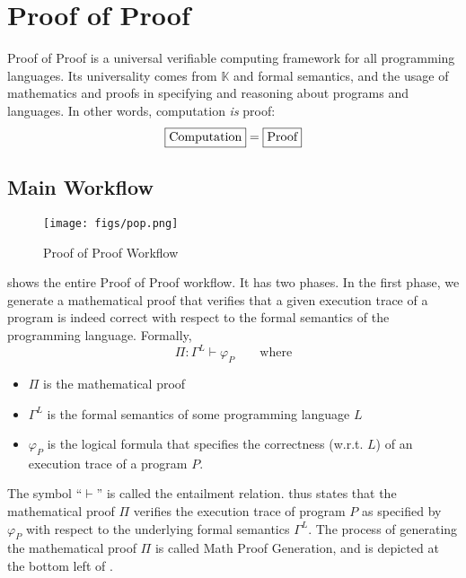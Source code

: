 \documentclass{article}
\newcommand{\K}{\ensuremath{\mathbb{K}}\xspace}
\begin{document}
\section{Proof of Proof}
\label{sec:pop}

Proof of Proof is a universal verifiable computing framework for all programming languages.
Its universality comes from \K and formal semantics,
and the usage of mathematics and proofs
in specifying and reasoning about programs and languages.
In other words,
computation \emph{is} proof:
\begin{equation*}
\boxed{\text{Computation}} = \boxed{\text{Proof\vphantom{Cp}}}
\end{equation*}


\subsection{Main Workflow}

\begin{figure}
\centering
\texttt{[image: figs/pop.png]}
\caption{Proof of Proof Workflow}
\label{fig:pop}
\end{figure}

 shows the entire Proof of Proof workflow. It has two phases.
In the first phase, we generate a mathematical proof that verifies that
a given execution trace of a program is indeed correct with respect to the formal semantics of the programming language.
Formally,
\begin{equation}
\Pi \colon \Gamma^L \vdash \varphi_P \qquad\text{where}
\label{eq:mathproof}
\end{equation}
\begin{itemize}
    \item $\Pi$ is the mathematical proof
    \item $\Gamma^L$ is the formal semantics of some programming language $L$
    \item $\varphi_P$ is the logical formula that specifies the correctness (w.r.t. $L$) of an execution trace
of a program $P$.
\end{itemize}
 
The symbol ``$\vdash$'' is called the entailment relation.
thus states that the mathematical proof $\Pi$ verifies the execution trace of program $P$
as specified by $\varphi_P$ with respect to the underlying formal semantics $\Gamma^L$.
The process of generating the mathematical proof $\Pi$
is called Math Proof Generation, and is depicted at the bottom left of .
\end{document}
